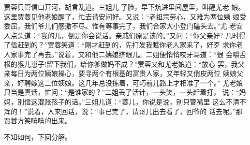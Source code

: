 贾蓉只管信口开河，胡言乱道。三姐儿了脸，早下炕进里间屋里，叫醒尤老
娘。这里贾蓉见他老娘醒了，忙去请安问好。又说：“老祖宗劳心，又难为两位姨
娘受委屈，我们爷儿们感激不尽。惟有等事完了，我们合家大小登门磕头去。”尤
老安人点头道：“我的儿，倒是你会说话。亲戚们原是该的。”又问：“你父亲好?
几时得了信赶到的？”贾蓉笑道：“刚才赶到的，先打发我瞧你老人家来了，好歹
求你老人家事完了再去。”说着，又和他二姨娘挤眼儿。二姐便悄悄咬牙骂道：“很
会嚼舌根的猴儿崽子!留下我们，给你爹做妈不成？”贾蓉又和尤老娘道：“放心
罢，我父亲每日为两位姨娘操心，要寻两个有根基的富贵人家，又年轻又俏皮两位
姨娘父亲，好聘嫁这二位姨娘。这几年总没拣着，可巧前儿路上才相准了一个。”
尤老娘只当是真话，忙问：“是谁家的？”二姐丢了活计，一头笑，一头赶着打，
说：“妈妈，别信这混账孩子的话。”三姐儿道：“蓉儿，你说是说，别只管嘴里
这么不清不浑的！”说着，人来回话，说：“事已完了，请哥儿出去看了，回爷的
话去呢。”那贾蓉方笑嘻嘻的出来。

不知如何，下回分解。
